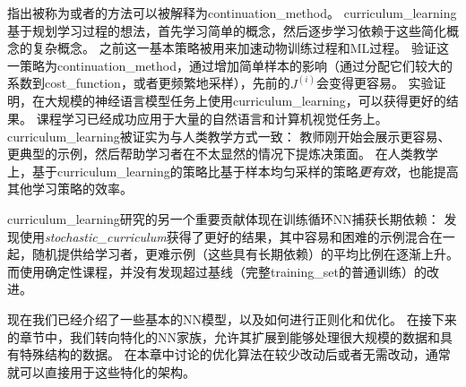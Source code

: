 \cite{Bengio+al-2009}指出被称为或者的方法可以被解释为\gls{continuation_method}。
\gls{curriculum_learning}基于规划学习过程的想法，首先学习简单的概念，然后逐步学习依赖于这些简化概念的复杂概念。
之前这一基本策略被用来加速动物训练过程\citep{Skinner1958,Peterson2004,Krueger+Dayan-2009}和\gls{ML}过程\citep{solomonoff1989system,Elman93,Sanger-1994}。
\cite{Bengio+al-2009}验证这一策略为\gls{continuation_method}，通过增加简单样本的影响（通过分配它们较大的系数到\gls{cost_function}，或者更频繁地采样），先前的$J^{(i)}$会变得更容易。
实验证明，在大规模的神经语言模型任务上使用\gls{curriculum_learning}，可以获得更好的结果。
课程学习已经成功应用于大量的自然语言\citep{Spitkovsky-et-al-HLT2010,collobert2011natural,Mikolov-ASRU-2011,Tu+Honavar-IJCAI2011}和计算机视觉\citep{Kumar+al-2010,Lee+Grauman-CVPR2011,Supancic+Ramanan-CVPR2013}任务上。
\gls{curriculum_learning}被证实为与人类教学方式一致\citep{Khan+Zhu+Mutlu-2011}：
教师刚开始会展示更容易、更典型的示例，然后帮助学习者在不太显然的情况下提炼决策面。
在人类教学上，基于\gls{curriculum_learning}的策略比基于样本均匀采样的策略\emph{更有效}，也能提高其他学习策略的效率\citep{Basu+Christensen-AAAI2013}。


\gls{curriculum_learning}研究的另一个重要贡献体现在训练循环\gls{NN}捕获长期依赖：
\cite{Zaremba+Sutskever-arxiv2014}发现使用\emph{\gls{stochastic_curriculum}}获得了更好的结果，其中容易和困难的示例混合在一起，随机提供给学习者，更难示例（这些具有长期依赖）的平均比例在逐渐上升。
而使用确定性课程，并没有发现超过基线（完整\gls{training_set}的普通训练）的改进。

现在我们已经介绍了一些基本的\gls{NN}模型，以及如何进行正则化和优化。
在接下来的章节中，我们转向特化的\gls{NN}家族，允许其扩展到能够处理很大规模的数据和具有特殊结构的数据。
在本章中讨论的优化算法在较少改动后或者无需改动，通常就可以直接用于这些特化的架构。

